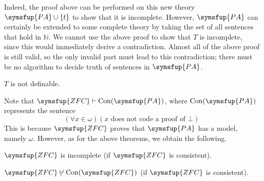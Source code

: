 Indeed, the proof above can be performed on this new theory \( \symsfup{PA} \cup \qty{t} \) to show that it is incomplete.
However, \( \symsfup{PA} \) can certainly be extended to some complete theory by taking the set of all sentences that hold in \( \mathbb N \).
We cannot use the above proof to show that \( T \) is incomplete, since this would immediately derive a contradiction.
Almost all of the above proof is still valid, so the only invalid part must lead to this contradiction; there must be no algorithm to decide truth of sentences in \( \symsfup{PA} \).
\begin{theorem}
    \( T \) is not definable.
\end{theorem}
Note that \( \symsfup{ZFC} \vdash \mathrm{Con}(\symsfup{PA}) \), where \( \mathrm{Con}(\symsfup{PA}) \) represents the sentence
\[ (\forall x \in \omega)(x \text{ does not code a proof of } \bot) \]
This is because \( \symsfup{ZFC} \) proves that \( \symsfup{PA} \) has a model, namely \( \omega \).
However, as for the above theorems, we obtain the following.
\begin{theorem}
    \( \symsfup{ZFC} \) is incomplete (if \( \symsfup{ZFC} \) is consistent).
\end{theorem}
\begin{theorem}
    \( \symsfup{ZFC} \not\vdash \mathrm{Con}(\symsfup{ZFC}) \) (if \( \symsfup{ZFC} \) is consistent).
\end{theorem}
